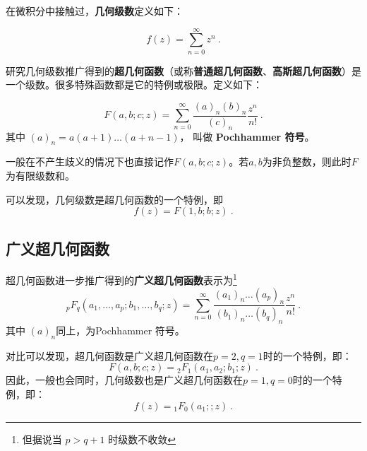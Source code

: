 

在微积分中接触过，\textbf{几何级数}定义如下：

\begin{equation}
f(z) = \sum_{n=0}^\infty z^n~.
\end{equation}

研究几何级数推广得到的\textbf{超几何函数}（或称\textbf{普通超几何函数}、\textbf{高斯超几何函数}）是一个级数。很多特殊函数都是它的特例或极限。定义如下：

\begin{equation}
F(a,b;c;z) = \sum_{n=0}^\infty \frac{(a)_n(b)_n}{(c)_n} \frac{z^n}{n!}~.
\end{equation}
其中 $(a)_n = a(a+1)\dots(a+n-1)$， 叫做 \textbf{Pochhammer 符号}。

一般在不产生歧义的情况下也直接记作$F(a,b;c;z)$。若$a,b$为非负整数，则此时$F$为有限级数和。

可以发现，几何级数是超几何函数的一个特例，即
\begin{equation}
f(z)=F(1,b;b;z)~.
\end{equation}

\subsection{广义超几何函数}

超几何函数进一步推广得到的\textbf{广义超几何函数}表示为\footnote{但据说当 $p > q+1$ 时级数不收敛}
\begin{equation}
{_pF_q}(a_1,\dots, a_p; b_1, \dots, b_q; z) = \sum_{n=0}^\infty \frac{(a_1)_n\dots (a_p)_n}{(b_1)_n\dots(b_q)_n} \frac{z^n}{n!}~.
\end{equation}
其中 $(a)_n$同上，为Pochhammer 符号。

对比可以发现，超几何函数是广义超几何函数在$p=2,q=1$时的一个特例，即：
\begin{equation}
F(a,b;c;z)={_2F_1}(a_1,a_2; b_1; z)~.
\end{equation}
因此，一般也会同时，几何级数也是广义超几何函数在$p=1,q=0$时的一个特例，即：
\begin{equation}
f(z)={_1F_0}(a_1;; z)~.
\end{equation}

